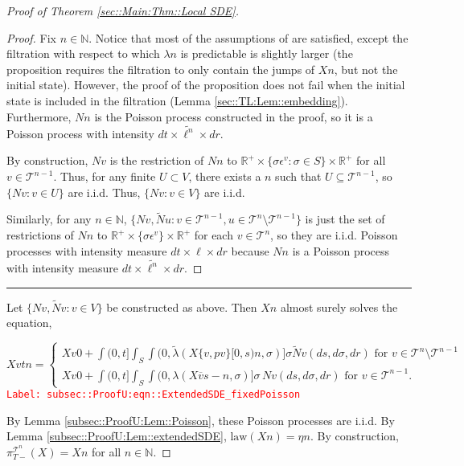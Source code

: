 \documentclass[12pt]{article}
\newcommand{\mb}{\mathbb}
\newcommand{\mc}{\mathcal}
\newcommand{\ov}{\overline}
\newcommand{\te}{\text}
\newcommand{\ep}{\epsilon}
\newcommand{\tr}{\textcolor{red}}
\newcommand{\labe}[1]{\tr{\texttt{Label: #1}}}
\newcommand{\ind}{\hspace{24pt}}
\newcommand{\lin}{\rule{\linewidth}{0.4 pt}}
\renewcommand{\v}{v}							%
\newcommand{\vv}{u}								%
\renewcommand{\U}{U}							%
\renewcommand{\S}{S}							%
\newcommand{\s}{\sigma}							%
\newcommand{\ev}{\ep}							%
\newcommand{\T}{T}								%
\renewcommand{\t}{t}							%
\newcommand{\proj}{\pi}							%
\renewcommand{\tt}{s}							%
\newcommand{\X}{X}								%
\newcommand{\vind}[1]{^{#1}}					%
\newcommand{\vsi}[1]{^{#1}}						%
\newcommand{\cl}{\ov}							%
\newcommand{\ts}[1]{_{#1}}						%
\newcommand{\tree}{\mc{T}}						%
\newcommand{\sln}[1]{^{#1}}						%
\newcommand{\poiss}{N}							%
\newcommand{\Sm}{\ell}							%
\newcommand{\rate}{\lambda}						%
\renewcommand{\r}{r}							%
\newcommand{\alt}[1]{\widetilde{#1}}			%
\newcommand{\mmm}{\eta}							%
\newcommand{\crate}{\alt{\lambda}}				%
\newcommand{\p}{p}								%
\begin{document}
\begin{proof}[Proof of Theorem \ref{sec::Main:Thm::Local SDE}]
\begin{proof}
Fix \(n \in \mb{N}\). Notice that most of the assumptions of \cite[Proposition 14.7.I(b)]{DalVer08} are satisfied, except the filtration with respect to which \(\rate{n}\) is predictable is slightly larger (the proposition requires the filtration to only contain the jumps of \(\X{}{}{n}\), but not the initial state). However, the proof of the proposition does not fail when the initial state is included in the filtration (Lemma \ref{sec::TL:Lem::embedding}). Furthermore, \(\poiss{n}\) is the Poisson process constructed in the proof, so it is a Poisson process with intensity \(d\t\times \alt{\Sm^n}\times d\r\).

\ind By construction, \(\poiss{\v}\) is the restriction of \(\poiss{n}\) to \(\mb{R}^+ \times \{\s\ev\vind{\v}: \s\in \S\}\times \mb{R}^+\) for all \(\v\in \tree\sln{n-1}\). Thus, for any finite \(\U \subset V\), there exists a \(n\) such that \(\U \subseteq \tree\sln{n-1}\), so \(\{\poiss{\v}: \v\in \U\}\) are i.i.d. Thus, \(\{\poiss{\v}: \v\in V\}\) are i.i.d.

\ind Similarly, for any \(n \in \mb{N}\), \(\{\poiss{\v},\alt{\poiss}{\vv}: \v \in \tree\sln{n-1},\vv\in\tree\sln{n}\setminus\tree\sln{n-1}\}\) is just the set of restrictions of \(\poiss{n}\) to \(\mb{R}^+\times\{\s\ev\vind{\v}\}\times\mb{R}^+\) for each \(\v\in \tree\sln{n}\), so they are i.i.d. Poisson processes with intensity measure \(d\t\times \Sm\times d\r\) because \(\poiss{n}\) is a Poisson process with intensity measure \(d\t\times\alt{\Sm^n}\times d\r\).
\end{proof}

\lin

Let \(\{\poiss{\v},\alt{\poiss}{\v}:\v\in V\}\) be constructed as above. Then \(\X{}{}{n}\) almost surely solves the equation,

\begin{equation}
\X{\v}{\t}{n} = \begin{cases}
\X{\v}{0}{} + \int{(0,\t]}\int_\S\int{(0,\crate{}{}(\X{\{\v,\p{\v}\}}{[0,\tt)}{n},\s)]}\s\alt{\poiss}{\v}(d\tt,d\s,d\r)\te{ for } \v \in \tree\sln{n}\setminus\tree\sln{n-1}\\
\X{\v}{0}{} + \int{(0,\t]}\int_\S\int{(0,\rate{}(\X{\cl{\v}}{\tt-}{n},\s)]}\s\,\poiss{\v}(d\tt,d\s,d\r)\te{ for } \v \in \tree\sln{n-1}.
\end{cases}
\label{subsec::ProofU:eqn::ExtendedSDE_fixedPoisson}
\end{equation}
\labe{subsec::ProofU:eqn::ExtendedSDE\_fixedPoisson}

By Lemma \ref{subsec::ProofU:Lem::Poisson}, these Poisson processes are i.i.d. By Lemma \ref{subsec::ProofU:Lem::extendedSDE}, \(\te{law}(\X{}{}{n}) = \mmm{}{}{n}\). By construction, \(\proj\vsi{\tree\sln{n}}\ts{\T-}(\X{}{}) = \X{}{}{n}\) for all \(n\in\mb{N}\).


\end{proof}
\end{document}
